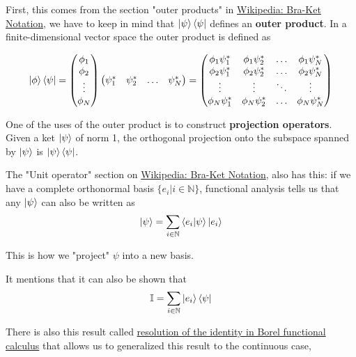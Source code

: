 First, this comes from the section "outer products" in
\href{https://en.wikipedia.org/wiki/Bra%E2%80%93ket_notation}{Wikipedia: Bra-Ket Notation},
we have to keep in mind that $\ket{\psi}\bra{\psi}$ defines an \textbf{outer product}.
In a finite-dimensional vector space the outer product is defined as

$$
\ket{\phi}\bra{\psi}
=
\begin{pmatrix}
    \phi_1 \\
    \phi_2 \\
    \vdots \\
    \phi_N 
\end{pmatrix}
\begin{pmatrix}
    \psi_{1}^{*} & \psi_{2}^{*} & \ldots & \psi_{N}^{*}
\end{pmatrix}
=
\begin{pmatrix} 
    \phi_1 \psi_{1}^{*} & \phi_1 \psi_{2}^{*} & \dots  & \phi_1 \psi_{N}^{*} \\
    \phi_2 \psi_{1}^{*} & \phi_2 \psi_{2}^{*} & \dots  & \phi_2 \psi_{N}^{*} \\
    \vdots              & \vdots              & \ddots & \vdots              \\
    \phi_N \psi_{1}^{*} & \phi_N \psi_{2}^{*} & \dots  & \phi_N \psi_{N}^{*} \\
\end{pmatrix}
$$

One of the uses of the outer product is to construct \textbf{projection operators}. Given a ket $\ket{\psi}$
of norm 1, the orthogonal projection onto the subspace spanned by $\ket{\psi}$ is $\ket{\psi}\bra{\psi}$.


The "Unit operator" section on \href{https://en.wikipedia.org/wiki/Bra%E2%80%93ket_notation}{Wikipedia: Bra-Ket Notation},
also has this: if we have a complete orthonormal basis $\{ e_i | i\in\mathbb{N} \}$,
functional analysis tells us that any $\ket{\psi}$ can also be written as
\begin{equation}
\ket{\psi} =
\sum_{i\in\mathbb{N}} \braket{e_i | \psi} \ket{e_i} \label{qm-formalism:discrete-basis}
\end{equation}

This is how we "project" $\psi$ into a new basis.

It mentions that it can also be shown that
$$
\mathbb{I} = \sum_{i\in\mathbb{N}} \ket{e_i} \bra{\psi}
$$

There is also this result called
\href{https://en.wikipedia.org/wiki/Borel_functional_calculus#Resolution_of_the_identity}{resolution of the identity in Borel functional calculus}
that allows us to generalized this result to the continuous case,

